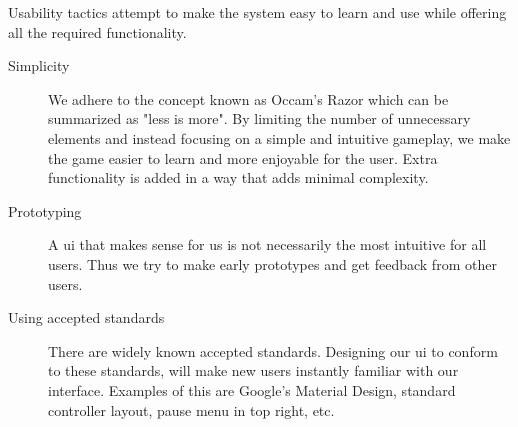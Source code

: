 	Usability tactics attempt to make the system easy to learn and use while offering all the required functionality.

		\begin{description}
			\item[Simplicity]
			We adhere to the concept known as Occam's Razor which can be summarized as "less is more". By limiting the number of unnecessary elements and instead focusing on a simple and intuitive gameplay, we make the game easier to learn and more enjoyable for the user. Extra functionality is added in a way that adds minimal complexity.

			\item[Prototyping]
			A \gls{ui} that makes sense for us is not necessarily the most intuitive for all users. Thus we try to make early prototypes and get feedback from other users.

			\item[Using accepted standards]
			There are widely known accepted standards. Designing our \gls{ui} to conform to these standards, will make new users instantly familiar with our interface. Examples of this are Google's Material Design, standard controller layout, pause menu in top right, etc.
		\end{description}
